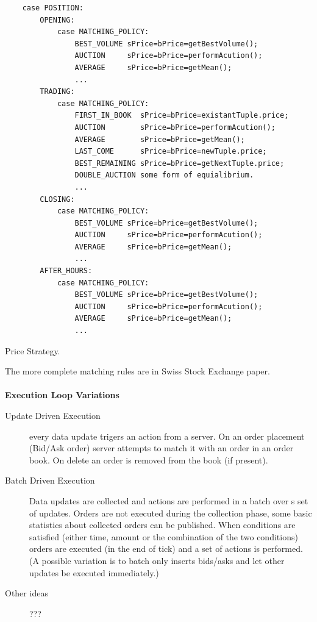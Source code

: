 \documentclass{article}
\begin{document}
\begin{program}
    \begin{verbatim}    
    case POSITION:
        OPENING:
            case MATCHING_POLICY:
                BEST_VOLUME sPrice=bPrice=getBestVolume();
                AUCTION     sPrice=bPrice=performAcution();
                AVERAGE     sPrice=bPrice=getMean();
                ...
        TRADING:
            case MATCHING_POLICY:
                FIRST_IN_BOOK  sPrice=bPrice=existantTuple.price;
                AUCTION        sPrice=bPrice=performAcution();
                AVERAGE        sPrice=bPrice=getMean();
                LAST_COME      sPrice=bPrice=newTuple.price;
                BEST_REMAINING sPrice=bPrice=getNextTuple.price;
                DOUBLE_AUCTION some form of equialibrium.
                ...       
        CLOSING:
            case MATCHING_POLICY:
                BEST_VOLUME sPrice=bPrice=getBestVolume();
                AUCTION     sPrice=bPrice=performAcution();
                AVERAGE     sPrice=bPrice=getMean();
                ...
        AFTER_HOURS:
            case MATCHING_POLICY:
                BEST_VOLUME sPrice=bPrice=getBestVolume();
                AUCTION     sPrice=bPrice=performAcution();
                AVERAGE     sPrice=bPrice=getMean();
                ...
    \end{verbatim}
\caption{Price Strategy. }
\end{program}

The more complete matching rules are in Swiss Stock Exchange paper.
\\
\\
{\bf Execution Loop Variations}

\begin{description}
    \item[Update Driven Execution] every data update trigers an action from a server. On an order placement (Bid/Ask order) server attempts to match it with an order in an order book. On delete an order is removed from the book (if present).
    \item[Batch Driven Execution] Data updates are collected and actions are performed in a batch over s set of updates. Orders are not executed during the collection phase, some basic statistics about collected orders can be published. When conditions are satisfied (either time, amount or the combination of the two conditions) orders are executed (in the end of tick) and a set of actions is performed. (A possible variation is to batch only inserts bids/asks and let other updates be executed immediately.)
    \item[Other ideas] ???
\end{description}
\end{document}
